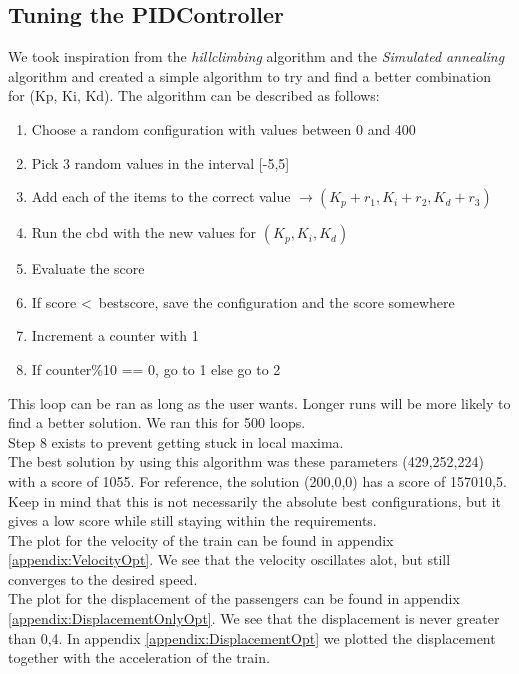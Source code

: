 \documentclass{article}
\begin{document}
\subsection{Tuning the PIDController}
We took inspiration from the \textit{hillclimbing} algorithm and the \textit{Simulated annealing} algorithm and created a simple algorithm to try and find a better combination for (Kp, Ki, Kd). The algorithm can be described as follows:
\begin{enumerate}
\item Choose a random configuration with values between 0 and 400
\item Pick 3 random values in the interval [-5,5]
\item Add each of the items to the correct value \(\rightarrow(K_p+r_1, K_i+r_2, K_d+r_3)\)
\item Run the cbd with the new values for \((K_p, K_i, K_d)\)
\item Evaluate the score
\item If score \textless\ bestscore, save the configuration and the score somewhere
\item Increment a counter with 1
\item If counter\%10 == 0, go to 1 else go to 2
\end{enumerate}
This loop can be ran as long as the user wants. Longer runs will be more likely to find a better solution. We ran this for 500 loops.
\\Step 8 exists to prevent getting stuck in local maxima. 
\\The best solution by using this algorithm was these parameters (429,252,224) with a score of 1055. For reference, the solution (200,0,0) has a score of 157010,5.
Keep in mind that this is not necessarily the absolute best configurations, but it gives a low score while still staying within the requirements.
\\The plot for the velocity of the train can be found in appendix \ref{appendix:VelocityOpt}. We see that the velocity oscillates alot, but still converges to the desired speed.
\\The plot for the displacement of the passengers can be found in appendix \ref{appendix:DisplacementOnlyOpt}. We see that the displacement is never greater than 0,4. In appendix \ref{appendix:DisplacementOpt} we plotted the displacement together with the acceleration of the train.
\newpage
\end{document}
